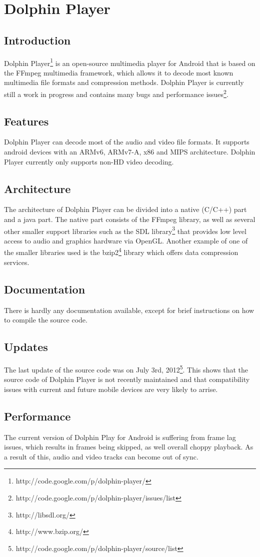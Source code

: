 \section{Dolphin Player}
\subsection{Introduction}
Dolphin Player\footnote{http://code.google.com/p/dolphin-player/} is an open-source multimedia player for Android that is based on the FFmpeg multimedia framework, which allows it to decode most known multimedia file formats and compression methods. Dolphin Player is currently still a work in progress and contains many bugs and performance issues\footnote{http://code.google.com/p/dolphin-player/issues/list}.
\subsection{Features}
Dolphin Player can decode most of the audio and video file formats. It supports android devices with an ARMv6, ARMv7-A, x86 and MIPS architecture. Dolphin Player currently only supports non-HD video decoding.
\subsection{Architecture}
The architecture of Dolphin Player can be divided into a native (C/C++) part and a java part. The native part consists of the FFmpeg library, as well as several other smaller support libraries such as the SDL library\footnote{http://libsdl.org/} that provides low level access to audio and graphics hardware via OpenGL. Another example of one of the smaller libraries used is the bzip2\footnote{http://www.bzip.org/} library which offers data compression services.
\subsection{Documentation}
There is hardly any documentation available, except for brief instructions on how to compile the source code.
\subsection{Updates}
The last update of the source code was on July 3rd, 2012\footnote{http://code.google.com/p/dolphin-player/source/list}. This shows that the source code of Dolphin Player is not recently maintained and that compatibility issues with current and future mobile devices are very likely to arrise.
\subsection{Performance}
The current version of Dolphin Play for Android is suffering from frame lag issues, which results in frames being skipped, as well overall choppy playback. As a result of this, audio and video tracks can become out of sync.


